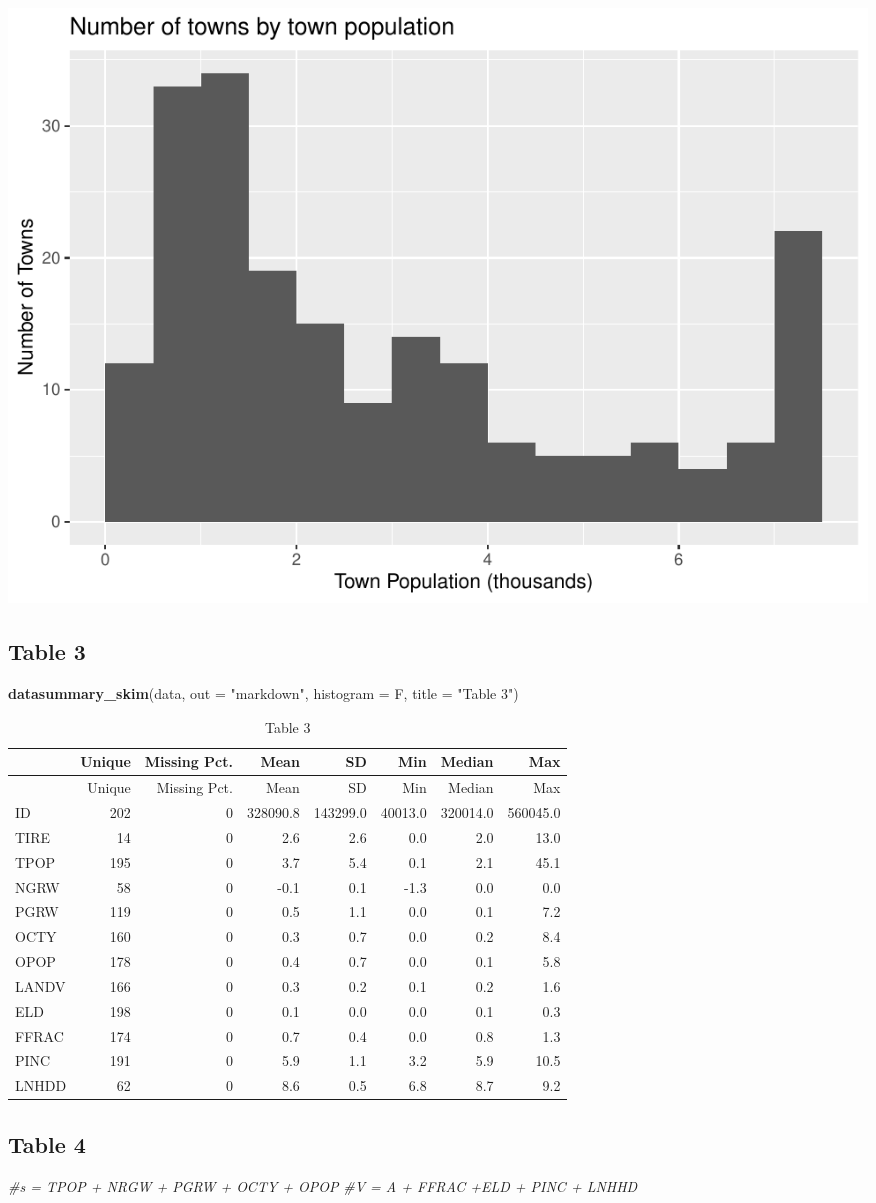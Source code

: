 \documentclass[]{article}
\newenvironment{Shaded}{\begin{snugshade}}{\end{snugshade}}
\newcommand{\KeywordTok}[1]{\textcolor[rgb]{0.13,0.29,0.53}{\textbf{{#1}}}}
\newcommand{\DataTypeTok}[1]{\textcolor[rgb]{0.13,0.29,0.53}{{#1}}}
\newcommand{\StringTok}[1]{\textcolor[rgb]{0.31,0.60,0.02}{{#1}}}
\newcommand{\CommentTok}[1]{\textcolor[rgb]{0.56,0.35,0.01}{\textit{{#1}}}}
\newcommand{\NormalTok}[1]{{#1}}
\begin{document}
\begin{center}\includegraphics[width=0.7\linewidth]{IO2_PS2_Estrada_files/figure-latex/figure2-1} \end{center}

\subsection{Table 3}\label{table-3}

\begin{Shaded}
\begin{Highlighting}[]
\KeywordTok{datasummary_skim}\NormalTok{(data, }\DataTypeTok{out =} \StringTok{"markdown"}\NormalTok{, }\DataTypeTok{histogram =} \NormalTok{F, }\DataTypeTok{title =} \StringTok{"Table 3"}\NormalTok{)}
\end{Highlighting}
\end{Shaded}

\begin{longtable}[c]{@{}lrrrrrrr@{}}
\caption{Table 3}\tabularnewline
\toprule
& Unique & Missing Pct. & Mean & SD & Min & Median & Max\tabularnewline
\midrule
\endfirsthead
\toprule
& Unique & Missing Pct. & Mean & SD & Min & Median & Max\tabularnewline
\midrule
\endhead
ID & 202 & 0 & 328090.8 & 143299.0 & 40013.0 & 320014.0 &
560045.0\tabularnewline
TIRE & 14 & 0 & 2.6 & 2.6 & 0.0 & 2.0 & 13.0\tabularnewline
TPOP & 195 & 0 & 3.7 & 5.4 & 0.1 & 2.1 & 45.1\tabularnewline
NGRW & 58 & 0 & -0.1 & 0.1 & -1.3 & 0.0 & 0.0\tabularnewline
PGRW & 119 & 0 & 0.5 & 1.1 & 0.0 & 0.1 & 7.2\tabularnewline
OCTY & 160 & 0 & 0.3 & 0.7 & 0.0 & 0.2 & 8.4\tabularnewline
OPOP & 178 & 0 & 0.4 & 0.7 & 0.0 & 0.1 & 5.8\tabularnewline
LANDV & 166 & 0 & 0.3 & 0.2 & 0.1 & 0.2 & 1.6\tabularnewline
ELD & 198 & 0 & 0.1 & 0.0 & 0.0 & 0.1 & 0.3\tabularnewline
FFRAC & 174 & 0 & 0.7 & 0.4 & 0.0 & 0.8 & 1.3\tabularnewline
PINC & 191 & 0 & 5.9 & 1.1 & 3.2 & 5.9 & 10.5\tabularnewline
LNHDD & 62 & 0 & 8.6 & 0.5 & 6.8 & 8.7 & 9.2\tabularnewline
\bottomrule
\end{longtable}

\subsection{Table 4}\label{table-4}

\begin{Shaded}
\begin{Highlighting}[]
\CommentTok{#s = TPOP + NRGW + PGRW + OCTY + OPOP}
\CommentTok{#V = A + FFRAC +ELD + PINC + LNHHD}
\end{Highlighting}
\end{Shaded}
\end{document}
